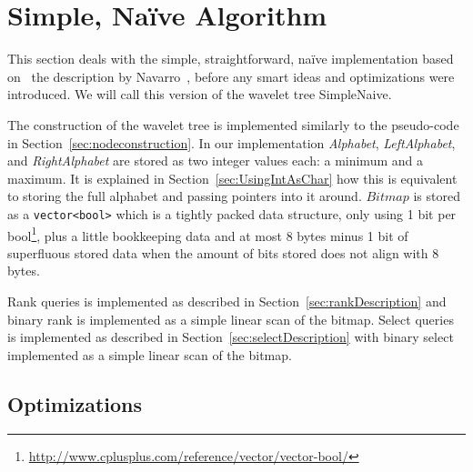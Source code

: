 \section{Simple, Naïve Algorithm}
This section deals with the simple, straightforward, naïve implementation based on ~the description by Navarro~, before any smart ideas and optimizations were introduced.
We will call this version of the wavelet tree SimpleNaive.

The construction of the wavelet tree is implemented similarly to the pseudo-code in Section~\ref{sec:nodeconstruction}.
In our implementation \textit{Alphabet}, \textit{LeftAlphabet}, and \textit{RightAlphabet} are stored as two integer values each: a minimum and a maximum.
It is explained in Section~\ref{sec:UsingIntAsChar} how this is equivalent to storing the full alphabet and passing pointers into it around.
$Bitmap$ is stored as a \texttt{vector<bool>} which is a tightly packed data structure, only using 1 bit per bool\footnote{\url{http://www.cplusplus.com/reference/vector/vector-bool/}}, plus a little bookkeeping data and at most 8 bytes minus 1 bit of superfluous stored data when the amount of bits stored does not align with 8 bytes.

Rank queries is implemented as described in Section~\ref{sec:rankDescription} and
binary rank is implemented as a simple linear scan of the bitmap.
Select queries is implemented as described in Section~\ref{sec:selectDescription} with binary select implemented as a simple linear scan of the bitmap.

\subsection{Optimizations}
\label{sec:simpleoptimizations}
